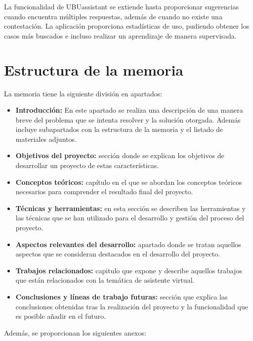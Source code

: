 La funcionalidad de UBUassistant se extiende hasta proporcionar sugerencias cuando encuentra múltiples respuestas, además de cuando no existe una contestación. La aplicación proporciona estadísticas de uso, pudiendo obtener los casos más buscados e incluso realizar un aprendizaje de manera supervisada.

\section{Estructura de la memoria}\label{estructura-de-la-memoria}
La memoria tiene la siguiente división en apartados:

\begin{itemize}
\tightlist
\item
  \textbf{Introducción:} En este apartado se realiza una descripción de una manera breve del problema que se intenta resolver y la solución otorgada. Además incluye subapartados con la estructura de la memoria y el listado de materiales adjuntos.
\item
  \textbf{Objetivos del proyecto:} sección donde se explican los objetivos de desarrollar un proyecto de estas características.
\item
  \textbf{Conceptos teóricos:} capítulo en el que se abordan los conceptos teóricos necesarios para comprender el resultado final del proyecto.
\item
  \textbf{Técnicas y herramientas:} en esta sección se describen las herramientas y las técnicas que se han utilizado para el desarrollo y gestión del proceso del proyecto.
\item
  \textbf{Aspectos relevantes del desarrollo:} apartado donde se tratan aquellos aspectos que se consideran destacados en el desarrollo del proyecto.
\item
  \textbf{Trabajos relacionados:} capitulo que expone y describe aquellos trabajos que están relacionados con la temática de asistente virtual.
\item
  \textbf{Conclusiones y líneas de trabajo futuras:} sección que explica las conclusiones obtenidas tras la realización del proyecto y la funcionalidad que es posible añadir en el futuro.
\end{itemize}

Además, se proporcionan los siguientes anexos:

